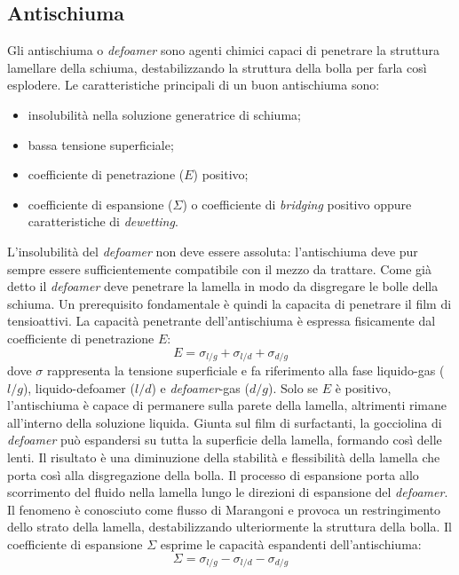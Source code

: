\subsection{Antischiuma}
Gli antischiuma o \textit{defoamer} sono agenti chimici capaci di penetrare la struttura lamellare della schiuma, destabilizzando la struttura della bolla per farla così esplodere. Le caratteristiche principali di un buon antischiuma sono:
\begin{itemize}
    \item insolubilità nella soluzione generatrice di schiuma;
    \item bassa tensione superficiale;
    \item coefficiente di penetrazione (\(E\)) positivo;
    \item coefficiente di espansione (\(\Sigma\)) o coefficiente di \textit{bridging} positivo oppure caratteristiche di \textit{dewetting}.
\end{itemize}

L'insolubilità del \textit{defoamer} non deve essere assoluta: l'antischiuma deve pur sempre essere sufficientemente compatibile con il mezzo da trattare. 
Come già detto il \textit{defoamer} deve penetrare la lamella in modo da disgregare le bolle della schiuma. Un prerequisito fondamentale è quindi la capacita di penetrare il film di tensioattivi. La capacità penetrante dell'antischiuma è espressa fisicamente dal coefficiente di penetrazione \(E\):
\[E = \sigma_{l/g} + \sigma_{l/d} + \sigma_{d/g} \label{eq:penetration} \]
dove \(\sigma\) rappresenta la tensione superficiale e fa riferimento alla fase liquido-gas (\(l/g\)), liquido-defoamer (\(l/d\)) e \textit{defoamer}-gas (\(d/g\)). Solo se \(E\) è positivo, l'antischiuma è capace di permanere sulla parete della lamella, altrimenti rimane all'interno della soluzione liquida. Giunta sul film di surfactanti,  la gocciolina di \textit{defoamer} può espandersi su tutta la superficie della lamella, formando così delle lenti. Il risultato è una diminuzione della stabilità e flessibilità della lamella che porta così alla disgregazione della bolla. Il processo di espansione porta allo scorrimento del fluido nella lamella lungo le direzioni di espansione del \textit{defoamer}. Il fenomeno è conosciuto come flusso di Marangoni e provoca un restringimento dello strato della lamella, destabilizzando ulteriormente la struttura della bolla. Il coefficiente di espansione \(\Sigma\) esprime le capacità espandenti dell'antischiuma:
\[\Sigma = \sigma_{l/g} - \sigma_{l/d} - \sigma_{d/g} \label{eq:spreading} \]

